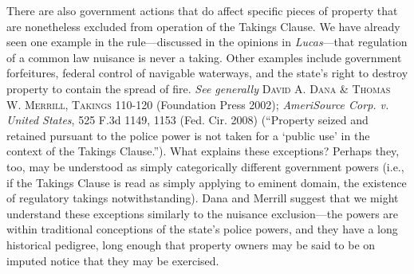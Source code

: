There are also government actions that do affect specific pieces of property
that are nonetheless excluded from operation of the Takings Clause. We have
already seen one example in the rule---discussed in the opinions in
\textit{Lucas}---that regulation of a common law nuisance is never a taking.
Other examples include government forfeitures, federal control of navigable
waterways, and the state's right to destroy property to contain the spread of
fire. \textit{See generally} \textsc{David A. Dana \& Thomas W. Merrill,
Takings} 110-120 (Foundation Press 2002); \emph{AmeriSource Corp. v.
United States}, 525 F.3d 1149, 1153 (Fed. Cir. 2008) (``Property seized and
retained pursuant to the police power is not taken for a `public use' in the
context of the Takings Clause.''). What explains these exceptions? Perhaps they,
too, may be understood as simply categorically different government powers
(i.e., if the Takings Clause is read as simply applying to eminent domain, the
existence of regulatory takings notwithstanding). Dana and Merrill suggest that
we might understand these exceptions similarly to the nuisance exclusion---the
powers are within traditional conceptions of the state's police powers, and they
have a long historical pedigree, long enough that property owners may be said to
be on imputed notice that they may be exercised. 

